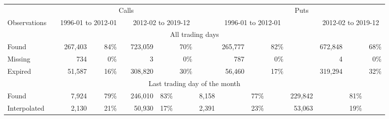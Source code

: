 

		\begin{tabular}{*{2}{l} *{15}{r} }
		       
		        
		         \multicolumn{2}{c}{}  & \multicolumn{7}{c}{Calls}  &  \multicolumn{1}{c}{} & 
		         \multicolumn{7}{c}{Puts} \\
		         
		          
		         \cline{3-9}
		         \cline{11-17}
		       
		         
		          \multicolumn{1}{l}{Observations} &  \multicolumn{1}{l}{} &
		          \multicolumn{3}{c}{1996-01 to 2012-01} & 
		          \multicolumn{1}{c}{} &
			\multicolumn{3}{c}{2012-02 to 2019-12} & 
			\multicolumn{1}{c}{} &
		          \multicolumn{3}{c}{1996-01 to 2012-01} & 
		          \multicolumn{1}{c}{} &
			\multicolumn{3}{c}{2012-02 to 2019-12} \\
		        

		       \hline
		       
		       \multicolumn{17}{c}{All trading days} \\ 
		       
		       \hline 

	
		Found &   & 
		267,403 &  & 84\% & 
		 & 
		 723,059 &  &70\% & 
		 & 
		 265,777 &  & 82\% & 
		 & 
		 672,848& &68\% 
		 \\

		
		Missing &   & 
		734 &  & 0\% & 
		 & 
		 3 &  &0\% & 
		 & 
		 787 &  & 0\% & 
		 & 
		 4& &0\% 
		 \\

		
		Expired &   & 
		51,587 &  & 16\% & 
		 & 
		 308,820 &  &30\% & 
		 & 
		 56,460 &  & 17\% & 
		 & 
		 319,294& &32\% 
		 \\

		
        \hline
        
         \multicolumn{17}{c}{Last trading day of the month} \\

	
		Found &   & 
		7,924 &  & 79\% & 
		 & 
		 246,010 & 83\% & 
		 & 
		 8,158 &  & 77\% & 
		 & 
		 229,842& &81\% 
		 \\

		
		Interpolated &   & 
		2,130 &  & 21\% & 
		 & 
		 50,930 & 17\% & 
		 & 
		 2,391 &  & 23\% & 
		 & 
		 53,063& &19\% 
		 \\

		

	        \hline
	    \end{tabular}
	
